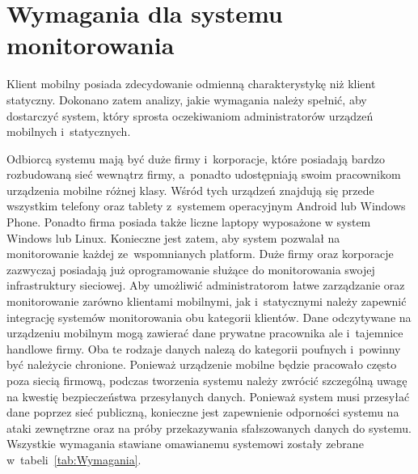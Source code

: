 \section[Wymagania][Wymagania dla systemu monitorowania]{Wymagania dla systemu monitorowania}

Klient mobilny posiada zdecydowanie odmienną charakterystykę niż
klient statyczny. Dokonano zatem analizy, jakie wymagania należy
spełnić, aby dostarczyć system, który sprosta oczekiwaniom
administratorów urządzeń mobilnych i~statycznych.

Odbiorcą systemu mają być duże firmy i~korporacje, które posiadają
bardzo rozbudowaną sieć wewnątrz firmy, a~ponadto udostępniają swoim
pracownikom urządzenia mobilne różnej klasy. Wśród tych urządzeń
znajdują się przede wszystkim telefony oraz tablety z~systemem
operacyjnym Android lub Windows Phone. Ponadto firma posiada także
liczne laptopy wyposażone w system Windows lub Linux. Konieczne jest
zatem, aby system pozwalał na monitorowanie każdej ze~wspomnianych
platform. Duże firmy oraz korporacje zazwyczaj posiadają już
oprogramowanie służące do monitorowania swojej infrastruktury
sieciowej. Aby umożliwić administratorom łatwe zarządzanie oraz
monitorowanie zarówno klientami mobilnymi, jak i~statycznymi należy
zapewnić integrację systemów monitorowania obu kategorii
klientów. Dane odczytywane na urządzeniu mobilnym mogą zawierać dane
prywatne pracownika ale i~tajemnice handlowe firmy. Oba te rodzaje
danych nalezą do kategorii poufnych i~powinny być należycie
chronione. Ponieważ urządzenie mobilne będzie pracowało często poza
siecią firmową, podczas tworzenia systemu należy zwrócić szczególną
uwagę na kwestię bezpieczeństwa przesyłanych danych. Ponieważ system
musi przesyłać dane poprzez sieć publiczną, konieczne jest zapewnienie
odporności systemu na ataki zewnętrzne oraz na próby przekazywania
sfałszowanych danych do systemu. Wszystkie wymagania stawiane
omawianemu systemowi zostały zebrane w~tabeli~\ref{tab:Wymagania}.


